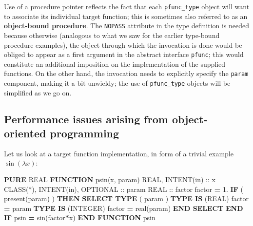 \documentclass[]{scrartcl}
\newenvironment{Shaded}{}{}
\newcommand{\BuiltInTok}[1]{\textcolor[rgb]{0.00,0.50,0.00}{#1}}
\newcommand{\DataTypeTok}[1]{\textcolor[rgb]{0.56,0.13,0.00}{#1}}
\newcommand{\FloatTok}[1]{\textcolor[rgb]{0.25,0.63,0.44}{#1}}
\newcommand{\FunctionTok}[1]{\textcolor[rgb]{0.02,0.16,0.49}{#1}}
\newcommand{\KeywordTok}[1]{\textcolor[rgb]{0.00,0.44,0.13}{\textbf{#1}}}
\newcommand{\NormalTok}[1]{#1}
\begin{document}
Use of a procedure pointer reflects the fact that each
\texttt{pfunc\_type} object will want to associate its individual target
function; this is sometimes also referred to as an \textbf{object-bound
procedure}. The \texttt{NOPASS} attribute in the type definition is
needed because otherwise (analogous to what we saw for the earlier
type-bound procedure examples), the object through which the invocation
is done would be obliged to appear as a first argument in the abstract
interface \texttt{pfunc}; this would constitute an additional imposition
on the implementation of the supplied functions. On the other hand, the
invocation needs to explicitly specify the \texttt{param} component,
making it a bit unwieldy; the use of \texttt{pfunc\_type} objects will
be simplified as we go on.

\subsection{Performance issues arising from object-oriented
programming}\label{performance-issues-arising-from-object-oriented-programming}

Let us look at a target function implementation, in form of a trivial
example \(\sin(\lambda x)\):

\begin{Shaded}
\begin{Highlighting}[]
\KeywordTok{PURE} \DataTypeTok{REAL} \KeywordTok{FUNCTION}\NormalTok{ psin(x, param)}
   \DataTypeTok{REAL}\NormalTok{, }\DataTypeTok{INTENT(in)} \DataTypeTok{::}\NormalTok{ x}
   \DataTypeTok{CLASS(*)}\NormalTok{, }\DataTypeTok{INTENT(in)}\NormalTok{, }\DataTypeTok{OPTIONAL} \DataTypeTok{::}\NormalTok{ param}
   \DataTypeTok{REAL} \DataTypeTok{::}\NormalTok{ factor}
\NormalTok{   factor }\KeywordTok{=} \FloatTok{1.}
   \KeywordTok{IF}\NormalTok{ ( }\FunctionTok{present}\NormalTok{(param) ) }\KeywordTok{THEN}
      \KeywordTok{SELECT TYPE}\NormalTok{ ( param )}
      \KeywordTok{TYPE IS}\NormalTok{ (}\DataTypeTok{REAL}\NormalTok{)}
\NormalTok{         factor }\KeywordTok{=}\NormalTok{ param}
      \KeywordTok{TYPE IS}\NormalTok{ (}\DataTypeTok{INTEGER}\NormalTok{)}
\NormalTok{         factor }\KeywordTok{=} \DataTypeTok{real(param)}
      \KeywordTok{END SELECT}
   \KeywordTok{END IF}
\NormalTok{   psin }\KeywordTok{=} \BuiltInTok{sin}\NormalTok{(factor}\KeywordTok{*}\NormalTok{x)}
\KeywordTok{END FUNCTION}\NormalTok{ psin}
\end{Highlighting}
\end{Shaded}
\end{document}
